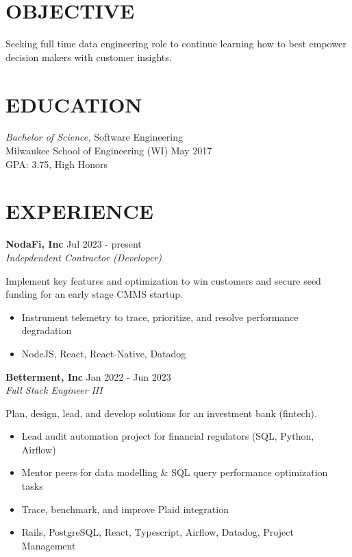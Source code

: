 \documentclass[line,margin]{res}
\begin{document}

\address{austin.dev@protonmail.com | (414) 334-4061}

\begin{resume}

\section{OBJECTIVE}
Seeking full time data engineering role to continue learning how to best empower decision makers with customer insights.

\section{EDUCATION}
{\sl Bachelor of Science,} Software Engineering \\
Milwaukee School of Engineering (WI) \hfill May 2017 \\
GPA: 3.75, High Honors \\

\section{EXPERIENCE}

\textbf{NodaFi, Inc} \hfill Jul 2023 - present \\
{\sl Indepdendent Contractor (Developer)}

Implement key features and optimization to win customers and secure seed funding for an early stage CMMS startup.

\begin{itemize}
\item Instrument telemetry to trace, prioritize, and resolve performance degradation
\item NodeJS, React, React-Native, Datadog
\end{itemize}

\textbf{Betterment, Inc} \hfill Jan 2022 - Jun 2023 \\
{\sl Full Stack Engineer III}

Plan, design, lead, and develop solutions for an investment bank (fintech).

\begin{itemize}
\item Lead audit automation project for financial regulators (SQL, Python, Airflow)
\item Mentor peers for data modelling \& SQL query performance optimization tasks
\item Trace, benchmark, and improve Plaid integration
\item Rails, PostgreSQL, React, Typescript, Airflow, Datadog, Project Management
\end{itemize}


\end{resume}
\end{document}
